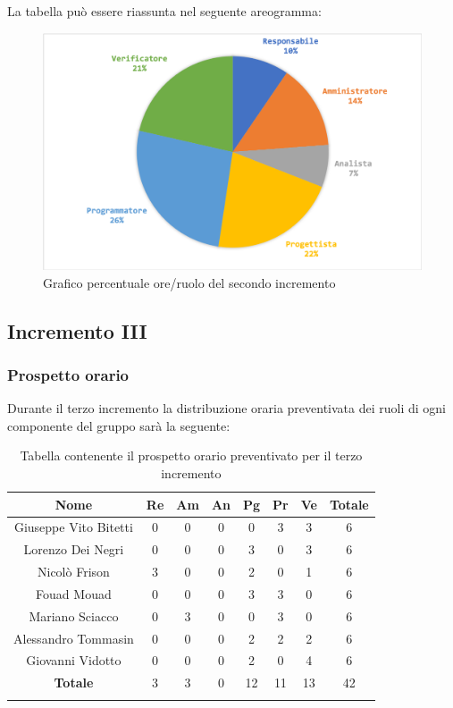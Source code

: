		La tabella può essere riassunta nel seguente areogramma:
		\begin{figure}[H]
			\centering
			\includegraphics[width=0.8\linewidth]{./images/preventivo/incremento2-2.png}
			\caption{Grafico percentuale ore/ruolo del secondo incremento}
			\label{fig:grafico costi ruolo incremento II}
		\end{figure}


		
	\subsection{Incremento III}
		\subsubsection{Prospetto orario}
		Durante il terzo incremento la distribuzione oraria preventivata dei ruoli di ogni componente del gruppo sarà la seguente:
		
		\begin{longtable}{|c|c|c|c|c|c|c|c|}
			\hline
			\rowcolor{lighter-grayer}
			\textbf{Nome} & \textbf{Re} & \textbf{Am} & \textbf{An} & \textbf{Pg}  & \textbf{Pr}   & \textbf{Ve} & \textbf{Totale} \\
			\hline
			\endfirsthead
			
			\hline
			Giuseppe Vito Bitetti 		 & 0 & 0 & 0 & 0 & 3 & 3 & 6\\
			\hline
			\hline
			Lorenzo Dei Negri			 & 0 & 0 & 0 & 3 & 0 & 3 & 6\\
			\hline
			\hline
			Nicolò Frison				    & 3 & 0 & 0 & 2 & 0 & 1 & 6\\
			\hline
			\hline
			Fouad Mouad 				 & 0 & 0 & 0 & 3 & 3 & 0 & 6\\
			\hline
			\hline
			Mariano Sciacco 			 & 0 & 3 & 0 & 0 & 3 & 0 & 6\\
			\hline
			\hline
			Alessandro Tommasin     & 0 & 0 & 0 & 2 & 2 & 2 & 6\\
			\hline
			\hline
			Giovanni Vidotto 			 & 0 & 0 & 0 & 2 & 0 & 4 & 6\\
			\hline 
			\textbf{Totale}			 		& 3 & 3 & 0 & 12 & 11 & 13 & 42\\
			\hline
			\caption{Tabella contenente il prospetto orario preventivato per il terzo incremento}
		\end{longtable}
		\pagebreak
		
